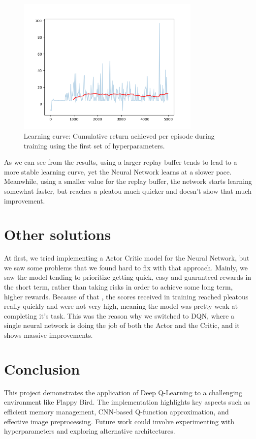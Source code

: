 \documentclass[a4paper,12pt]{article}
\begin{document}
\begin{figure}
    \includegraphics[width=0.8\textwidth]{second_plot.png} 
    \caption{Learning curve: Cumulative return achieved per episode during training using the first set of hyperparameters.}
    \label{fig:learning_curve2}
\end{figure}
As we can see from the results, using a larger replay buffer tends to lead to a more stable learning curve, yet the Neural Network learns at a
slower pace. Meanwhile, using a smaller value for the replay buffer, the network starts learning somewhat faster, but reaches a pleatou much quicker
and doesn't show that much improvement. 

\pagebreak

\section{Other solutions}
At first, we tried implementing a Actor Critic model for the Neural Network, but we saw some problems that we found hard to fix with that approach.
Mainly, we saw the model tending to prioritize getting quick, easy and guaranteed rewards in the short term, rather than taking risks in order to achieve some long term, higher
rewards. Because of that , the scores received in training reached pleatous really quickly and were not very high, meaning the model was pretty weak at completing it's task.
This was the reason why we switched to DQN, where a single neural network is doing the job of both the Actor and the Critic, and it shows massive improvements.
\section{Conclusion}
This project demonstrates the application of Deep Q-Learning to a challenging environment like Flappy Bird. The implementation highlights key aspects such as efficient memory management, CNN-based Q-function approximation, and effective image preprocessing. Future work could involve experimenting with hyperparameters and exploring alternative architectures.
\end{document}
